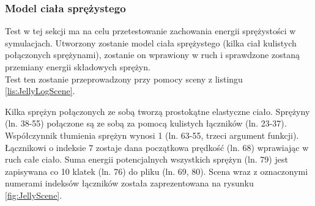 \subsubsection{Model ciała sprężystego}
Test w tej sekcji ma na celu przetestowanie zachowania energii sprężystości w
symulacjach. Utworzony zostanie model ciała sprężystego (kilka ciał kulistych
połączonych sprężynami), zostanie on wprawiony w ruch i sprawdzone zostaną
przemiany energii składowych sprężyn.\\
Test ten zostanie przeprowadzony przy pomocy sceny z listingu
\ref{lis:JellyLogScene}.



Kilka sprężyn połączonych ze sobą tworzą prostokątne elastyczne ciało. Sprężyny
(ln. 38-55) połączone są ze sobą za pomocą kulistych łączników (ln. 23-37).
Współczynnik tłumienia sprężyn wynosi 1 (ln. 63-55, trzeci argument funkcji).
Łącznikowi o indeksie 7 zostaje dana początkowa prędkość (ln. 68) wprawiając w
ruch całe ciało. Suma energii potencjalnych wszystkich sprężyn (ln. 79) jest
zapisywana co 10 klatek (ln. 76) do pliku (ln. 69, 80). Scena wraz z oznaczonymi
numerami indeksów łączników została zaprezentowana na rysunku
\ref{fig:JellyScene}.

